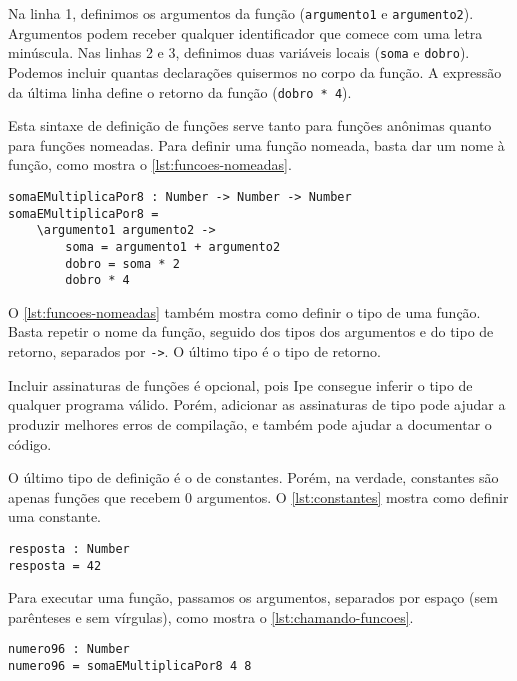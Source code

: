 Na linha 1, definimos os argumentos da função (\texttt{argumento1} e \texttt{argumento2}).
Argumentos podem receber qualquer identificador que comece com uma letra minúscula.
Nas linhas 2 e 3, definimos duas variáveis locais (\texttt{soma} e \texttt{dobro}).
Podemos incluir quantas declarações quisermos no corpo da função. A expressão da
última linha define o retorno da função (\texttt{dobro * 4}).

Esta sintaxe de definição de funções serve tanto para funções anônimas quanto para
funções nomeadas. Para definir uma função nomeada, basta dar um nome à função, como
mostra o \autoref{lst:funcoes-nomeadas}.

\begin{lstlisting}[label={lst:funcoes-nomeadas},caption={Exemplo de como definir uma função nomeada}]
somaEMultiplicaPor8 : Number -> Number -> Number
somaEMultiplicaPor8 =
    \argumento1 argumento2 ->
        soma = argumento1 + argumento2
        dobro = soma * 2
        dobro * 4
\end{lstlisting}

O \autoref{lst:funcoes-nomeadas} também mostra como definir o tipo de uma função.
Basta repetir o nome da função, seguido dos tipos dos argumentos e do tipo de retorno,
separados por \texttt{->}. O último tipo é o tipo de retorno.

Incluir assinaturas de funções é opcional, pois Ipe consegue inferir o tipo de
qualquer programa válido. Porém, adicionar as assinaturas de tipo pode ajudar a
produzir melhores erros de compilação, e também pode ajudar a documentar o código.

O último tipo de definição é o de constantes. Porém, na verdade, constantes são
apenas funções que recebem 0 argumentos. O \autoref{lst:constantes} mostra como
definir uma constante.

\begin{lstlisting}[label={lst:constantes},caption={Exemplo de como definir uma constante}]
resposta : Number
resposta = 42
\end{lstlisting}

Para executar uma função, passamos os argumentos, separados por espaço (sem parênteses
e sem vírgulas), como mostra o \autoref{lst:chamando-funcoes}.

\begin{lstlisting}[label={lst:chamando-funcoes},caption={Exemplo de como chamar uma função}]
numero96 : Number
numero96 = somaEMultiplicaPor8 4 8
\end{lstlisting}


